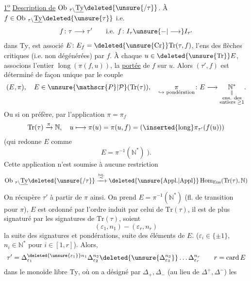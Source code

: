 \uline{1\textsuperscript{o}} \uline{Description de} $\operatorname{Ob}\,{}_{\tau\backslash}\underline{\mathrm{Ty}}\deleted{\unsure{/\tau}}$.
À $f\in\operatorname{Ob}\,{}_{\tau\backslash}\underline{\mathrm{Ty}}\deleted{\unsure{\tau}}$ i.e.
\[
 f\colon\tau\longrightarrow\tau'\qquad\text{i.e. } f\colon I_\tau\unsure{\mathbin{-}|\longrightarrow}I_{\tau'}
\]
dans $\underline{\mathrm{Ty}}$, est associé $E\colon E_f=\deleted{\unsure{\mathrm{Cr}}}\mathrm{Tr}(\tau,f)$, l'ens des flèches
 critiques (i.e. non dégénérées) par $f$. À chaque
$u\in\deleted{\unsure{\mathrm{Tr}}}E$, associons l'entier $\operatorname{long}(\pi(f,u))$,
la \uline{portée} de $f$ sur $u$. Alors  $(\tau',f)$ est déterminé
de façon unique par le couple
\[
 (E,\pi),\quad E\in\unsure{\mathscr{P}|\mathcal{P}}(\mathrm{Tr}(\tau)),\quad
 \underset{\text{\(\hookrightarrow\) pondération}}{\pi}\colon E\longrightarrow
 \underset{\substack{\parallel\\\text{ens. des}\\\text{entiers }\geq 1}}{\mathbb N^*}.
\]
Ou si on préfère, par l'application $\pi=\pi_f$
\[
 \mathrm{Tr}(\tau)\xrightarrow{\pi}\mathbb N,\quad
 u\longmapsto\pi(u)=\pi(u,f)=(\inserted{\operatorname{long}}\pi_{\tau'}(f(u)))
\]
(qui redonne $E$ comme
\[
 E=\pi^{-1}(\mathbb N^*)\;).
\]
Cette application n'est soumise à aucune restriction
\[
 \operatorname{Ob}\,{}_{\tau\backslash}\underline{\mathrm{Ty}}\deleted{\unsure{/\tau}}
 \xrightarrow[\ ]{\overset{\mathrm{bij.}}{\sim}}
 \deleted{\unsure{\mathrm{Appl.}|\mathrm{Appl}}}\operatorname{Hom}_{\mathrm{Ens}}(\mathrm{Tr}(\tau),\mathbb N)
\]
On récupère $\tau'$ à partir de $\pi$ ainsi. On
prend $E=\pi^{-1}(\mathbb N^*)$ (fl. de transition  
pour $\pi$), $E$ est  ordonné par l'ordre induit
par celui de $\mathrm{Tr}(\tau)$, il est de plus signaturé
par les signatures de $\mathrm{Tr}(\tau)$, soient
\[
 (\varepsilon_1,n_1)\mathbin{-}(\varepsilon_r,n_r)
\]
la suite des signatures et pondérations,  
suite des éléments de $E$. \quad ($\varepsilon_i\in\{\pm1\}$, $n_i\in\mathbb N^*$
pour $i\in[1,r]$). Alors,
\[
 \tau'=\Delta_{\varepsilon_1}^{\deleted{\unsure{\varepsilon_1}}n_1}\Delta_{\varepsilon_2}^{n_2}
 \deleted{\unsure{\Delta_{\varepsilon_3}^{n_3}}}\ldots\Delta_{\varepsilon_r}^{n_r}
 \qquad r=\operatorname{card}E
\]
dans le monoïde libre $\mathrm{Ty}$, où on a désigné
par $\Delta_+,\Delta_-$ (au lieu de $\Delta^+,\Delta^-$) les
